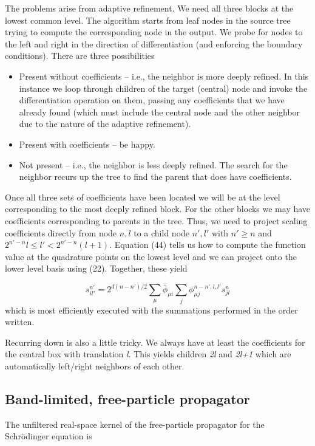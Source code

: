 \documentclass[letterpaper]{article}
\newcommand\liststyleLiv{%
\renewcommand\labelitemi{${\bullet}$}
\renewcommand\labelitemii{${\circ}$}
\renewcommand\labelitemiii{${\blacksquare}$}
\renewcommand\labelitemiv{${\bullet}$}
}
\begin{document}
The problems arise from adaptive refinement. We need all three blocks at the lowest common level. The algorithm starts
from leaf nodes in the source tree trying to compute the corresponding node in the output. We probe for nodes to the
left and right in the direction of differentiation (and enforcing the boundary conditions). There are three
possibilities

\liststyleLiv
\begin{itemize}
\item Present without coefficients -- i.e., the neighbor is more deeply refined. In this instance we loop through
children of the target (central) node and invoke the differentiation operation on them, passing any coefficients that
we have already found (which must include the central node and the other neighbor due to the nature of the adaptive
refinement).
\item Present with coefficients -- be happy.
\item Not present -- i.e., the neighbor is less deeply refined. The search for the neighbor recurs up the tree to find
the parent that does have coefficients.
\end{itemize}
Once all three sets of coefficients have been located we will be at the level corresponding to the most deeply refined
block. For the other blocks we may have coefficients corresponding to parents in the tree. Thus, we need to project
scaling coefficients directly from node  $n,l$ to a child node  $n',l'$ with  $n'\ge n$ and  $2^{n'-n}l\le
l'<2^{n'-n}(l+1)$. Equation (44) tells us how to compute the function value at the quadrature points on the lowest
level and we can project onto the lower level basis using (22). Together, these yield

\begin{equation}
s_{il'}^{n'}=2^{d(n-n')/2}\sum _{\mu }{{\bar{\phi }}_{\mu i}\sum _{j}{\phi _{\mu j}^{n-n',l,l'}s_{\mathit{jl}}^{n}}}
\end{equation}
which is most efficiently executed with the summations performed in the order written.

Recurring down is also a little tricky. We always have at least the coefficients for the central box with translation
\textit{l}. This yields children \textit{2l} and \textit{2l+1} which are automatically left/right neighbors of each
other.

\subsection{Band-limited, free-particle propagator}
The unfiltered real-space kernel of the free-particle propagator for the Schr\"odinger equation is 
\end{document}
